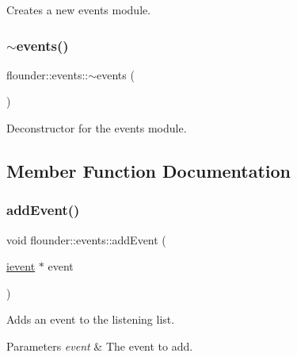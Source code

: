 Creates a new events module. 

\mbox{\label{classflounder_1_1events_aaf446dc74703b8ce1c04f5cf8cb06eed}} 
\subsubsection{\texorpdfstring{$\sim$events()}{~events()}}
{\footnotesize\ttfamily flounder\+::events\+::$\sim$events (\begin{DoxyParamCaption}{ }\end{DoxyParamCaption})}



Deconstructor for the events module. 



\subsection{Member Function Documentation}
\mbox{\label{classflounder_1_1events_a6cb8ff41cf2fbf6a92ca78c122f07eb9}} 
\subsubsection{\texorpdfstring{add\+Event()}{addEvent()}}
{\footnotesize\ttfamily void flounder\+::events\+::add\+Event (\begin{DoxyParamCaption}\item[{\hyperlink{classflounder_1_1ievent}{ievent} $\ast$}]{event }\end{DoxyParamCaption})}



Adds an event to the listening list. 


\begin{DoxyParams}{Parameters}
{\em event} & The event to add. \\
\hline
\end{DoxyParams}
\mbox{\label{classflounder_1_1events_aba09dc039ab9ddb860932a3f8d964f1e}} 
